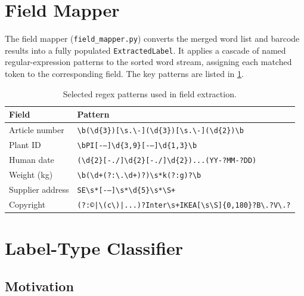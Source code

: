 \section{Field Mapper}

The field mapper (\texttt{field\_mapper.py}) converts the merged word list and barcode
results into a fully populated \texttt{ExtractedLabel}. It applies a cascade of named
regular-expression patterns to the sorted word stream, assigning each matched token to the
corresponding field. The key patterns are listed in \cref{tab:regex_fields}.

\begin{table}[h]
\centering
\caption{Selected regex patterns used in field extraction.}
\label{tab:regex_fields}
\begin{tabularx}{\textwidth}{lX}
\toprule
\textbf{Field} & \textbf{Pattern} \\
\midrule
Article number & \texttt{\textbackslash b(\textbackslash d\{3\})[\textbackslash s.\textbackslash-](\textbackslash d\{3\})[\textbackslash s.\textbackslash-](\textbackslash d\{2\})\textbackslash b} \\
Plant ID & \texttt{\textbackslash bPI[-–]\textbackslash d\{3,9\}[-–]\textbackslash d\{1,3\}\textbackslash b} \\
Human date & \texttt{(\textbackslash d\{2\}[-./]\textbackslash d\{2\}[-./]\textbackslash d\{2\})...(YY-?MM-?DD)} \\
Weight (kg) & \texttt{\textbackslash b(\textbackslash d+(?:\textbackslash.\textbackslash d+)?)\textbackslash s*k(?:g)?\textbackslash b} \\
Supplier address & \texttt{SE\textbackslash s*[-–]\textbackslash s*\textbackslash d\{5\}\textbackslash s*\textbackslash S+} \\
Copyright & \texttt{(?:©|\textbackslash(c\textbackslash)|...)?Inter\textbackslash s+IKEA[\textbackslash s\textbackslash S]\{0,180\}?B\textbackslash.?V\textbackslash.?} \\
\bottomrule
\end{tabularx}
\end{table}

\section{Label-Type Classifier}

\subsection{Motivation}

